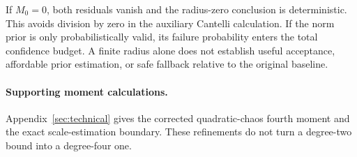 If $M_0=0$, both residuals vanish and the radius-zero conclusion is deterministic. This avoids division by zero in the auxiliary Cantelli calculation. If the norm prior is only probabilistically valid, its failure probability enters the total confidence budget. A finite radius alone does not establish useful acceptance, affordable prior estimation, or safe fallback relative to the original baseline.

\paragraph{Supporting moment calculations.} Appendix~\ref{sec:technical} gives the corrected quadratic-chaos fourth moment and the exact scale-estimation boundary. These refinements do not turn a degree-two bound into a degree-four one.
